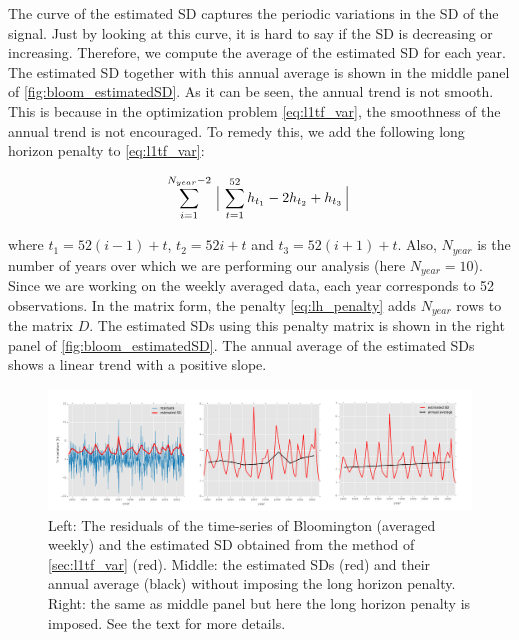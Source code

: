 \documentclass{article}
\begin{document}
The curve of the estimated SD captures the periodic variations in the SD of the signal. Just by looking at this curve, it is hard to say if the SD is decreasing or increasing. Therefore, we compute the average of the estimated SD for each year. The estimated SD together with this annual average is shown in the middle panel of \autoref{fig:bloom_estimatedSD}. As it can be seen, the annual trend is not smooth. This is because in the optimization problem \eqref{eq:l1tf_var}, the smoothness of the annual trend is not encouraged. To remedy this, we add the following long horizon penalty to \eqref{eq:l1tf_var}:

\begin{equation}
\sum_{i=1}^{N_{year}-2} \Big\arrowvert \sum_{t=1}^{52} h_{t_1}-2h_{t_2}+h_{t_3}  \Big\arrowvert
\label{eq:lh_penalty}
\end{equation}

 where $t_1=52(i-1)+t$, $t_2=52i+t$ and $t_3=52(i+1)+t$. Also, $N_{year}$ is the number of years over which we are performing our analysis (here $N_{year}=10$). Since we are working on the weekly averaged data, each year corresponds to 52 observations. In the matrix form, the penalty \eqref{eq:lh_penalty} adds $N_{year}$ rows to the matrix $D$. The estimated SDs using this penalty matrix is shown in the right panel of \autoref{fig:bloom_estimatedSD}. The annual average of the estimated SDs shows a linear trend with a positive slope.

\begin{figure}[tb]
	\vskip 0.2in
	\begin{center}
		\centerline{\includegraphics[width=\columnwidth]{Figures/bloom_estimatedSD}}
		\caption{Left: The residuals of the time-series of Bloomington (averaged weekly) and the estimated SD obtained from the method of \autoref{sec:l1tf_var} (red). Middle: the estimated SDs (red) and their annual average (black) without imposing the long horizon penalty. Right: the same as middle panel but here the long horizon penalty is imposed. See the text for more details.}
		\label{fig:bloom_estimatedSD}
	\end{center}
	\vskip -0.2in
\end{figure} 
\end{document}

